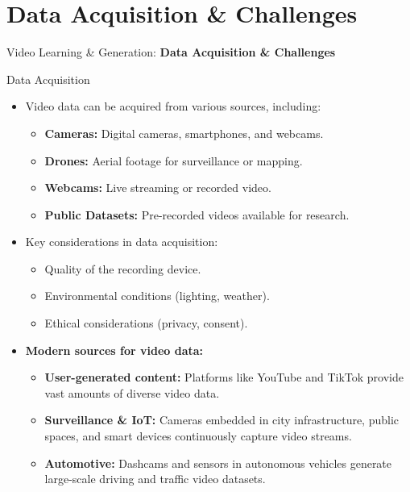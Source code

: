\section{Data Acquisition \& Challenges}
\begin{frame}{}
    \LARGE Video Learning \& Generation: \textbf{Data Acquisition \& Challenges}
\end{frame}

\begin{frame}[allowframebreaks]{Data Acquisition}
    \begin{itemize}
        \item Video data can be acquired from various sources, including:
        \begin{itemize}
            \item \textbf{Cameras:} Digital cameras, smartphones, and webcams.
            \item \textbf{Drones:} Aerial footage for surveillance or mapping.
            \item \textbf{Webcams:} Live streaming or recorded video.
            \item \textbf{Public Datasets:} Pre-recorded videos available for research.
        \end{itemize}
        \item Key considerations in data acquisition:
        \begin{itemize}
            \item Quality of the recording device.
            \item Environmental conditions (lighting, weather).
            \item Ethical considerations (privacy, consent).
        \end{itemize}
    \end{itemize}
\framebreak
    \begin{itemize}
        \item \textbf{Modern sources for video data:}
        \begin{itemize}
            \item \textbf{User-generated content:} Platforms like YouTube and TikTok provide vast amounts of diverse video data.
            \item \textbf{Surveillance \& IoT:} Cameras embedded in city infrastructure, public spaces, and smart devices continuously capture video streams.
            \item \textbf{Automotive:} Dashcams and sensors in autonomous vehicles generate large-scale driving and traffic video datasets.

\end{itemize}
\end{itemize}
\end{frame}
